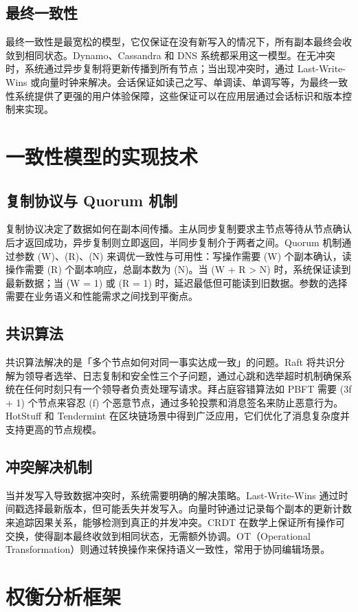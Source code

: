 \section{最终一致性}
最终一致性是最宽松的模型，它仅保证在没有新写入的情况下，所有副本最终会收敛到相同状态。Dynamo、Cassandra 和 DNS 系统都采用这一模型。在无冲突时，系统通过异步复制将更新传播到所有节点；当出现冲突时，通过 Last-Write-Wins 或向量时钟来解决。会话保证如读己之写、单调读、单调写等，为最终一致性系统提供了更强的用户体验保障，这些保证可以在应用层通过会话标识和版本控制来实现。\par
\chapter{一致性模型的实现技术}
\section{复制协议与 Quorum 机制}
复制协议决定了数据如何在副本间传播。主从同步复制要求主节点等待从节点确认后才返回成功，异步复制则立即返回，半同步复制介于两者之间。Quorum 机制通过参数 (W)、(R)、(N) 来调优一致性与可用性：写操作需要 (W) 个副本确认，读操作需要 (R) 个副本响应，总副本数为 (N)。当 (W + R > N) 时，系统保证读到最新数据；当 (W = 1) 或 (R = 1) 时，延迟最低但可能读到旧数据。参数的选择需要在业务语义和性能需求之间找到平衡点。\par
\section{共识算法}
共识算法解决的是「多个节点如何对同一事实达成一致」的问题。Raft 将共识分解为领导者选举、日志复制和安全性三个子问题，通过心跳和选举超时机制确保系统在任何时刻只有一个领导者负责处理写请求。拜占庭容错算法如 PBFT 需要 (3f + 1) 个节点来容忍 (f) 个恶意节点，通过多轮投票和消息签名来防止恶意行为。HotStuff 和 Tendermint 在区块链场景中得到广泛应用，它们优化了消息复杂度并支持更高的节点规模。\par
\section{冲突解决机制}
当并发写入导致数据冲突时，系统需要明确的解决策略。Last-Write-Wins 通过时间戳选择最新版本，但可能丢失并发写入。向量时钟通过记录每个副本的更新计数来追踪因果关系，能够检测到真正的并发冲突。CRDT 在数学上保证所有操作可交换，使得副本最终收敛到相同状态，无需额外协调。OT（Operational Transformation）则通过转换操作来保持语义一致性，常用于协同编辑场景。\par
\chapter{权衡分析框架}
